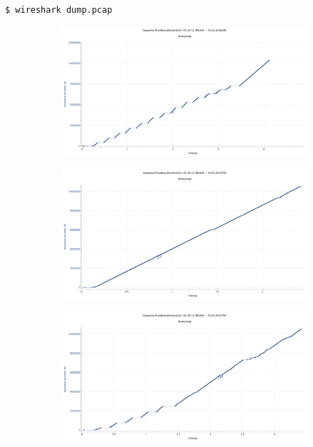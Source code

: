 \documentclass[
    pdftex,
    12pt,
    parskip=half,
    a4paper
]{scrartcl}
\begin{document}
\vspace{2cm}%
\begin{lstlisting}
$ wireshark dump.pcap
\end{lstlisting}
\vspace{4cm}%

\begin{figure}
	\begin{subfigure}{0.5\textwidth}
		\includegraphics[width=1\textwidth]{../1/wireshark/constant1.pdf}
	\end{subfigure}
	\begin{subfigure}{0.5\textwidth}
		\includegraphics[width=1\textwidth]{../1/wireshark/constant2.pdf}
	\end{subfigure}
	\begin{subfigure}{0.5\textwidth}
		\includegraphics[width=1\textwidth]{../1/wireshark/constant3.pdf}

\end{subfigure}
\end{figure}
\end{document}
